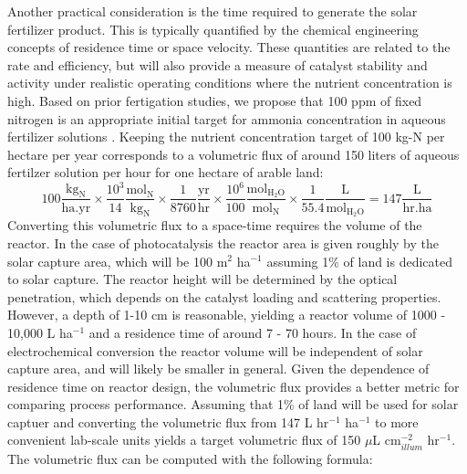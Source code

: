 Another practical consideration is the time required to generate the solar fertilizer product. This is typically quantified by the chemical engineering concepts of residence time or space velocity. These quantities are related to the rate and efficiency, but will also provide a measure of catalyst stability and activity under realistic operating conditions where the nutrient concentration is high. Based on prior fertigation studies, we propose that 100 ppm of fixed nitrogen is an appropriate initial target for ammonia concentration in aqueous fertilizer solutions \cite{phocaides2007handbook}. Keeping the nutrient concentration target of 100 kg-N per hectare per year corresponds to a volumetric flux of around 150 liters of aqueous fertilzer solution per hour for one hectare of arable land:
\begin{equation}
\mathrm{
100 \frac{kg_N}{ha . yr} \times \frac{10^3}{14} \frac{mol_{N}}{kg_N} \times \frac{1}{8760} \frac{yr}{hr} \times \frac{10^6}{100} \frac{mol_{H_2O}}{mol_{N}} \times \frac{1}{55.4} \frac{L}{mol_{H_2O}} = 147 \frac{L}{hr . ha} 
}
\end{equation}
Converting this volumetric flux to a space-time requires the volume of the reactor. In the case of photocatalysis the reactor area is given roughly by the solar capture area, which will be 100 m$^2$ ha$^{-1}$ assuming 1\% of land is dedicated to solar capture. The reactor height will be determined by the optical penetration, which depends on the catalyst loading and scattering properties. However, a depth of 1-10 cm is reasonable, yielding a reactor volume of 1000 - 10,000 L ha$^{-1}$ and a residence time of around 7 - 70 hours. In the case of electrochemical conversion the reactor volume will be independent of solar capture area, and will likely be smaller in general. Given the dependence of residence time on reactor design, the volumetric flux provides a better metric for comparing process performance. Assuming that 1\% of land will be used for solar captuer and converting the volumetric flux from 147 L hr$^{-1}$ ha$^{-1}$ to more convenient lab-scale units yields a target volumetric flux of 150 $\mu$L cm$^{-2}_{illum}$ hr$^{-1}$. The volumetric flux can be computed with the following formula:

